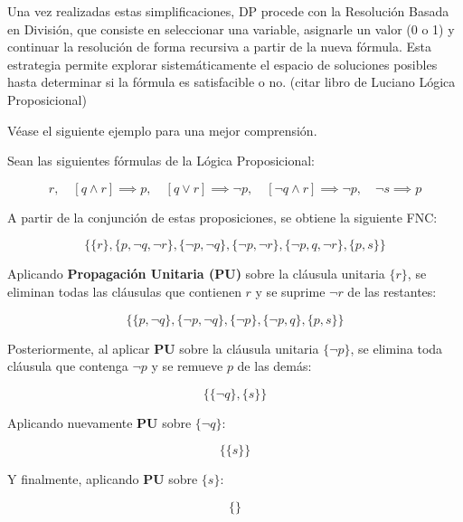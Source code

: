 Una vez realizadas estas simplificaciones, DP procede con la Resolución Basada en División, que consiste en seleccionar una variable, asignarle un valor (0 o 1) y continuar la resolución de forma recursiva a partir de la nueva fórmula. Esta estrategia permite explorar sistemáticamente el espacio de soluciones posibles hasta determinar si la fórmula es satisfacible o no. (citar libro de Luciano L\'ogica Proposicional)

V\'ease el siguiente ejemplo para una mejor comprensi\'on.

Sean las siguientes fórmulas de la Lógica Proposicional:

\begin{equation*}
    r, \quad [q \land r] \implies p, \quad [q \lor r] \implies \neg p, \quad [\neg q \land r] \implies \neg p, \quad \neg s \implies p
\end{equation*}

A partir de la conjunción de estas proposiciones, se obtiene la siguiente FNC:

\begin{equation*}
    \{\{r\}, \{p,\neg q, \neg r\}, \{\neg p, \neg q\}, \{\neg p, \neg r\}, \{\neg p, q, \neg r\}, \{p, s\}\}
\end{equation*}

Aplicando \textbf{Propagación Unitaria (PU)} sobre la cláusula unitaria $\{r\}$, se eliminan todas las cláusulas que contienen $r$ y se suprime $\neg r$ de las restantes:

\begin{equation*}
    \{\{p,\neg q\}, \{\neg p,\neg q\}, \{\neg p\}, \{\neg p,q\}, \{p,s\}\}
\end{equation*}

Posteriormente, al aplicar \textbf{PU} sobre la cláusula unitaria $\{\neg p\}$, se elimina toda cláusula que contenga $\neg p$ y se remueve $p$ de las demás:

\begin{equation*}
    \{\{\neg q\}, \{s\}\}
\end{equation*}

Aplicando nuevamente \textbf{PU} sobre $\{\neg q\}$:

\begin{equation*}
    \{\{s\}\}
\end{equation*}

Y finalmente, aplicando \textbf{PU} sobre $\{s\}$:

\begin{equation*}
    \{\}
\end{equation*}

